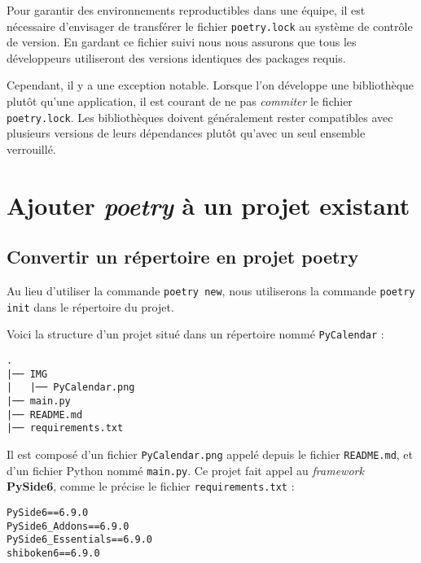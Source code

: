 Pour garantir des environnements reproductibles dans une équipe, il est nécessaire d'envisager de transférer le fichier \texttt{poetry.lock} au système de contrôle de version. En gardant ce fichier suivi nous nous assurons que tous les développeurs utiliseront des versions identiques des packages requis.

Cependant, il y a une exception notable. Lorsque l'on développe une bibliothèque plutôt qu’une application, il est courant de ne pas \textit{commiter} le fichier \texttt{poetry.lock}. Les bibliothèques doivent généralement rester compatibles avec plusieurs versions de leurs dépendances plutôt qu’avec un seul ensemble verrouillé.

\section{Ajouter \textit{poetry} à un projet existant}
\subsection*{Convertir un répertoire en projet \textbf{poetry}}
Au lieu d’utiliser la commande \texttt{poetry new}, nous utiliserons la commande \texttt{poetry init} dans le répertoire du projet.

Voici la structure d'un projet situé dans un répertoire nommé \texttt{PyCalendar} :
\begin{verbatim}
.
|── IMG
|   |── PyCalendar.png
|── main.py
|── README.md
|── requirements.txt
\end{verbatim}

Il est composé d'un fichier \texttt{PyCalendar.png} appelé depuis le fichier \texttt{README.md}, et d'un fichier Python nommé \texttt{main.py}. Ce projet fait appel au \textit{framework} \textbf{PySide6}, comme le précise le fichier \texttt{requirements.txt} :
\begin{verbatim}
PySide6==6.9.0
PySide6_Addons==6.9.0
PySide6_Essentials==6.9.0
shiboken6==6.9.0
\end{verbatim}

